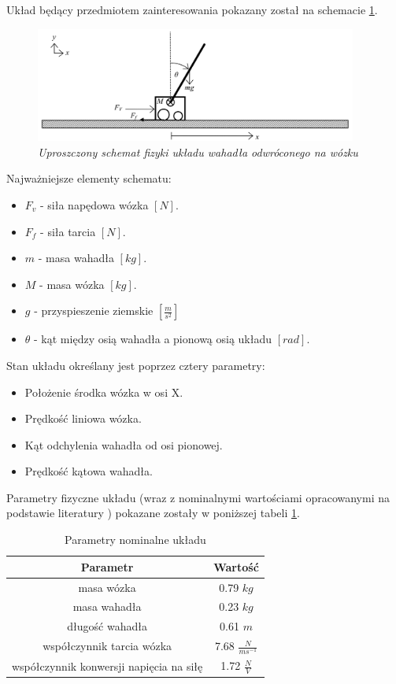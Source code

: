 \documentclass[12pt, oneside]{report}
\theoremstyle{definition}
\begin{document}
Układ będący przedmiotem zainteresowania pokazany został na schemacie \ref{SytemSchemeImage}.

\begin{figure}[H]
	\centering
		\includegraphics[width = 300pt]{SystemScheme} 
		\caption{\textit{Uproszczony schemat fizyki układu wahadła odwróconego na wózku \cite{LMIP} }}
		\label{SytemSchemeImage}
\end{figure}

Najważniejsze elementy schematu:
\begin{itemize}
\item \(F_v\) - siła napędowa wózka \([N]\).
\item \(F_f\) - siła tarcia \([N]\).
\item \(m\) - masa wahadła \([kg]\). 
\item \(M\) - masa wózka \([kg]\).
\item \(g\) - przyspieszenie ziemskie \([\frac{m}{s^2}]\) 
\item \(\theta\) - kąt między osią wahadła a pionową osią układu \([rad]\).
\end{itemize}

Stan układu określany jest poprzez cztery parametry:
\begin{itemize}
\item Położenie środka wózka w osi X.
\item Prędkość liniowa wózka.
\item Kąt odchylenia wahadła od osi pionowej.
\item Prędkość kątowa wahadła.
\end{itemize}

Parametry fizyczne układu (wraz z nominalnymi wartościami opracowanymi na podstawie literatury \cite{LMIP}) pokazane zostały w poniższej tabeli \ref{table:NominalParameters}.
\begin{table}[H]
\begin{center}
\begin{tabular}{|c|c|}
  \hline 
  Parametr & Wartość\\
  \hline
  masa wózka & 0.79 \(kg\) \\
  \hline
  masa wahadła & 0.23 \(kg\) \\
  \hline
  długość wahadła & 0.61 \(m\) \\
  \hline
  współczynnik tarcia wózka & 7.68 \(\frac{N}{ms^{-1}}\) \\
  \hline
  współczynnik konwersji napięcia na siłę & 1.72 \(\frac{N}{V}\) \\
  \hline
\end{tabular} 
\end{center}
\caption{Parametry nominalne układu}
\label{table:NominalParameters}
\end{table}
\end{document}
